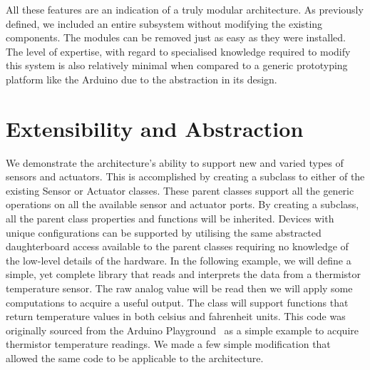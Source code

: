 All these features are an indication of a truly modular architecture. As previously defined, we included an entire subsystem without modifying the existing components. The modules can be removed just as easy as they were installed. The level of expertise, with regard to specialised knowledge required to modify this system is also relatively minimal when compared to a generic prototyping platform like the Arduino due to the abstraction in its design.


\section{Extensibility and Abstraction} %
\label{sec:extensibility_abstraction}
We demonstrate the \xten architecture's ability to support new and varied types of sensors and actuators. This is accomplished by creating a subclass to either of the existing Sensor or Actuator classes. These parent classes support all the generic operations on all the available sensor and actuator ports. By creating a subclass, all the parent class properties and functions will be inherited. Devices with unique configurations can be supported by utilising the same abstracted daughterboard access available to the parent classes requiring no knowledge of the low-level details of the hardware.
In the following example, we will define a simple, yet complete library that reads and interprets the data from a thermistor temperature sensor. The raw analog value will be read then we will apply some computations to acquire a useful output. The class will support functions that return temperature values in both celsius and fahrenheit units. This code was originally sourced from the Arduino Playground~\parencite{therm} as a simple example to acquire thermistor temperature readings. We made a few simple modification that allowed the same code to be applicable to the \xten architecture.

